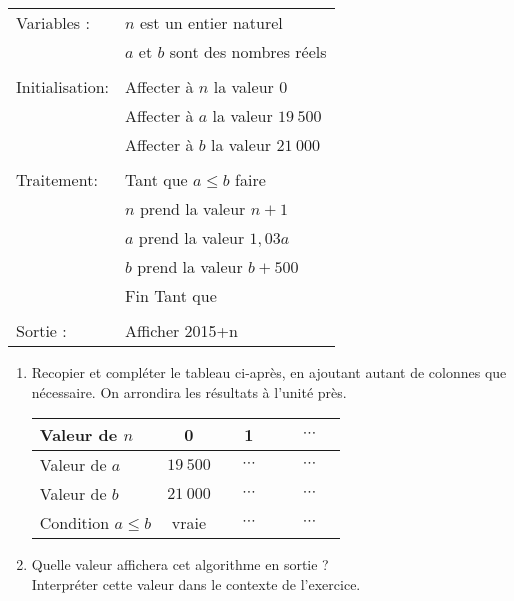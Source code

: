 \begin{center}
     \begin{extern}%
          \begin{tabularx}{0.60\linewidth}{|l|X|}\hline
               Variables :	& $n$ est un entier naturel\\
               &$a$ et $b$ sont des nombres réels\\
               & \\
               Initialisation: &Affecter à $n$ la valeur 0\\
               &Affecter à $a$ la valeur $19\ 500$\\
               &Affecter à $b$ la valeur $21\ 000$\\
               & \\
               Traitement: &Tant que $a \leqslant  b$ faire\\
               &\qquad$n$ prend la valeur $n + 1$\\
               &\qquad$a$ prend la valeur $1,03a$\\
               &\qquad$b$ prend la valeur $b+500$\\
               &Fin Tant que\\
               & \\
               Sortie :	&Afficher 2015+n \\
               \hline
          \end{tabularx}
     \end{extern}
\end{center}
\begin{enumerate}
     \item Recopier et compléter le tableau ci-après, en ajoutant autant de colonnes que nécessaire. On arrondira les résultats à l'unité près.
     \begin{center}
          \begin{tabular}{|l|c|c|c|}\hline %
               Valeur de $n$	&0	&	1 &	 $\quad \cdots \quad$  \\ \hline
               Valeur de $a$	&$19\ 500$	& $\quad \cdots \quad$ & $\quad \cdots \quad$ 	 \\ \hline
               Valeur de $b$	&$21\ 000$	& $\quad \cdots \quad$ & $\quad \cdots \quad$  \\ \hline
               Condition $a \leqslant  b$	&vraie	& $\quad \cdots \quad$ & $\quad \cdots \quad$ 	\\ \hline
          \end{tabular}
     \end{center}
     \item Quelle valeur affichera cet algorithme en sortie ?\\
     Interpréter cette valeur dans le contexte de l'exercice.
\end{enumerate}
